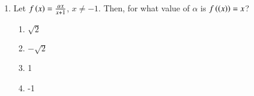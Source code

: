 \documentclass[journal]{IEEEtran}
\begin{document}
\begin{enumerate}
\item Let $f\left(x\right)=\frac{\alpha x}{x+1}$, $x\neq-1$. Then, for what value of $\alpha$ is $f\left(\left(x\right)\right)=x$?

\hfill{}

\begin{multicols}{4}
	\begin{enumerate}
		\item $\sqrt{2}$ 
		\item $-\sqrt{2}$ 
		\item 1 
		\item -1
	\end{enumerate}
\end{multicols}

\end{enumerate}
\end{document}
